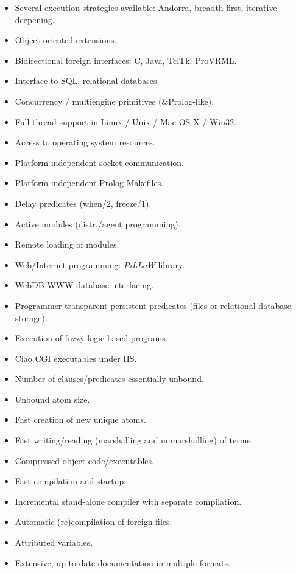 \documentclass{article}
\begin{document}
\begin{itemize}
%
\item Several execution strategies available: Andorra, breadth-first,
  iterative deepening.
\item Object-oriented extensions.
\item Bidirectional foreign interfaces: C, Java, TclTk, ProVRML.
\item Interface to SQL, relational databases.
\item Concurrency / multiengine primitives (\&Prolog-like). 
\item Full thread support in Linux / Unix / Mac OS X / Win32.
\item Access to operating system resources.
\item Platform independent socket communication.
\item Platform independent Prolog Makefiles.
\item Delay predicates (when/2, freeze/1).
\item Active modules (distr./agent programming).
\item Remote loading of modules.
\item Web/Internet programming: \emph{PiLLoW} library.
\item WebDB WWW database interfacing.
\item Programmer-transparent 
  persistent predicates (files or relational database storage).
\item Execution of fuzzy logic-based programs.
%
\item Ciao CGI executables under IIS.
\item Number of clauses/predicates essentially unbound.
\item Unbound atom size.
\item Fast creation of new unique atoms.
\item Fast writing/reading (marshalling and unmarshalling) of terms.
\item Compressed object code/executables. %
\item Fast compilation and startup. 
\item Incremental stand-alone compiler with separate compilation.
\item Automatic (re)compilation of foreign files.
\item Attributed variables.
\item Extensive, up to date documentation in multiple formats.
\end{itemize}
\end{document}
